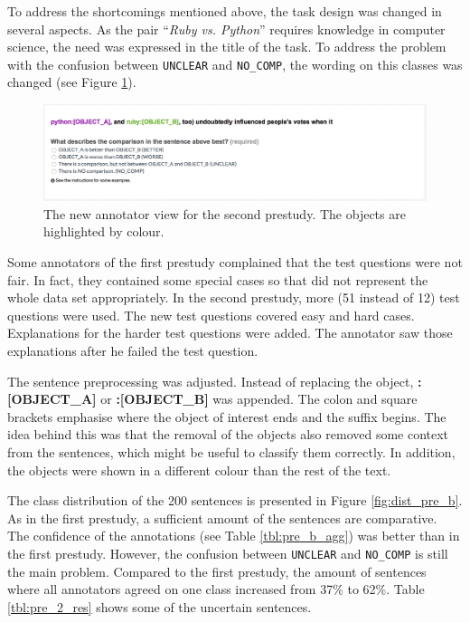  To address the shortcomings mentioned above, the task design was changed in several aspects. As the pair \enquote{\emph{Ruby vs. Python}} requires knowledge in computer science, the need was expressed in the title of the task.
To address the problem with the confusion between \texttt{UNCLEAR} and \texttt{NO\_COMP}, the wording on this classes was changed (see Figure \ref{img:2_question}). 

\begin{figure}[thb]
\centering
\includegraphics[width=1\textwidth]{images/prestudy/2_question}

\caption{The new annotator view for the second prestudy. The objects are highlighted by colour.}
\label{img:2_question}
\end{figure}

Some annotators of the first prestudy complained that the test questions were not fair. In fact, they contained some special cases so that did not represent the whole data set appropriately. In the second prestudy, more (51 instead of 12) test questions were used. The new test questions covered easy and hard cases. Explanations for the harder test questions were added. The annotator saw those explanations after he failed the test question.



The sentence preprocessing was adjusted. Instead of replacing the object, \mbox{\textbf{{\color[HTML]{9A14B2}:{[}OBJECT\_A{]}}}} or \textbf{{\color[HTML]{6CB219}:{[}OBJECT\_B{]}}} was appended. The colon and square brackets emphasise where the object of interest ends and the suffix begins. The idea behind this was that the removal of the objects also removed some context from the sentences, which might be useful to classify them correctly. In addition, the objects were shown in a different colour than the rest of the text.\newline



The class distribution of the 200 sentences is presented in Figure \ref{fig:dist_pre_b}.  As in the first prestudy, a sufficient amount of the sentences are comparative. The confidence of the annotations (see Table \ref{tbl:pre_b_agg}) was better than in the first prestudy. However, the confusion between \texttt{UNCLEAR} and \texttt{NO\_COMP} is still the main problem. Compared to the first prestudy, the amount of sentences where all annotators agreed on one class increased from 37\% to 62\%. Table \ref{tbl:pre_2_res} shows some of the uncertain sentences.


